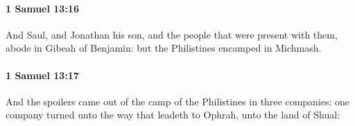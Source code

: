 		\paragraph{1 Samuel 13:16} %
			\label{1SAMUEL-13-16}

			And Saul, and Jonathan his son, and the people that were present with them, abode in Gibeah of Benjamin: but the Philistines encamped in Michmash.


		\paragraph{1 Samuel 13:17} %
			\label{1SAMUEL-13-17}

			And the spoilers came out of the camp of the Philistines in three companies: one company turned unto the way that leadeth to Ophrah, unto the land of Shual:


